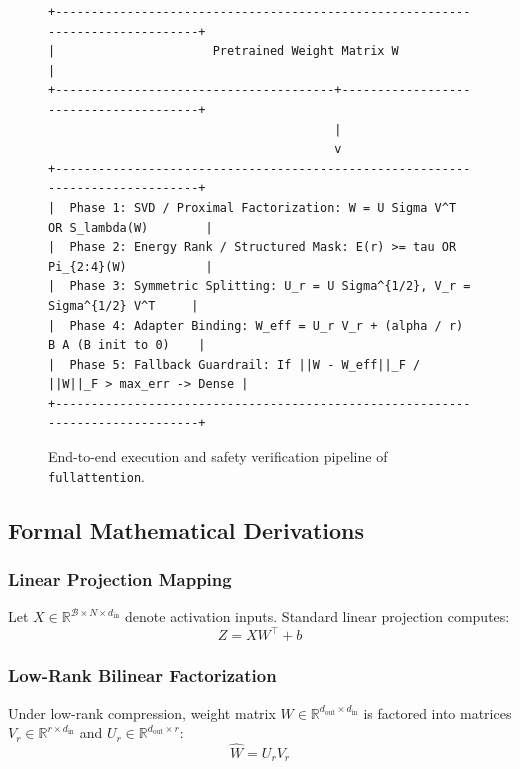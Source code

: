 {\begin{figure}[t]
\centering
\begin{verbatim}
+-------------------------------------------------------------------------------+
|                      Pretrained Weight Matrix W                               |
+---------------------------------------+---------------------------------------+
                                        |
                                        v
+-------------------------------------------------------------------------------+
|  Phase 1: SVD / Proximal Factorization: W = U Sigma V^T OR S_lambda(W)        |
|  Phase 2: Energy Rank / Structured Mask: E(r) >= tau OR Pi_{2:4}(W)           |
|  Phase 3: Symmetric Splitting: U_r = U Sigma^{1/2}, V_r = Sigma^{1/2} V^T     |
|  Phase 4: Adapter Binding: W_eff = U_r V_r + (alpha / r) B A (B init to 0)    |
|  Phase 5: Fallback Guardrail: If ||W - W_eff||_F / ||W||_F > max_err -> Dense |
+-------------------------------------------------------------------------------+
\end{verbatim}
\caption{End-to-end execution and safety verification pipeline of \texttt{fullattention}.}
\end{figure}

\subsection{Formal Mathematical Derivations}

\subsubsection{Linear Projection Mapping}
Let $X \in \mathbb{R}^{\mathcal{B} \times N \times d_{\text{in}}}$ denote activation inputs. Standard linear projection computes:
\begin{equation}
Z = X W^\top + b
\end{equation}

\subsubsection{Low-Rank Bilinear Factorization}
Under low-rank compression, weight matrix $W \in \mathbb{R}^{d_{\text{out}} \times d_{\text{in}}}$ is factored into matrices $V_r \in \mathbb{R}^{r \times d_{\text{in}}}$ and $U_r \in \mathbb{R}^{d_{\text{out}} \times r}$:
\begin{equation}
\hat{W} = U_r V_r
\end{equation}

}
